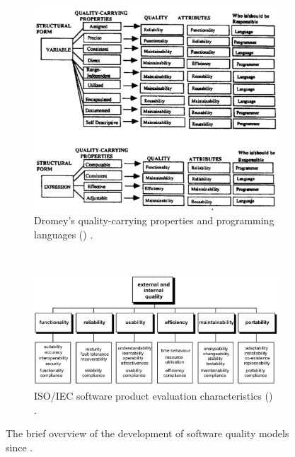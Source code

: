 \begin{figure}[h!]
  ~
  \begin{subfigure}[t]{0.49\linewidth}
    \centering
    \includegraphics[width=0.8\linewidth]{dromey-quality-carrying-properites}
    \caption{Dromey's quality-carrying properties and programming languages (\citeyear{Dromey:1995wy}) \citep{Dromey:1995wy}.}
    \label{fig:background:software-quality:quality-models:development:dromey}
  \end{subfigure}
  ~
  \begin{subfigure}[t]{0.49\linewidth}
    \centering
    \includegraphics[width=\linewidth]{iso-software-product-evaluation-characteristics}
    \caption{ISO/IEC software product evaluation characteristics (\citeyear{ISO9126:1999}) \citep{ISO9126:1999}.}
    \label{fig:background:software-quality:quality-models:development:iso}
  \end{subfigure}
  \caption{The brief overview of the development of software quality models since \citeyear{McCall:1977wm}.}
  \label{fig:background:software-quality:quality-models:development}
\end{figure}